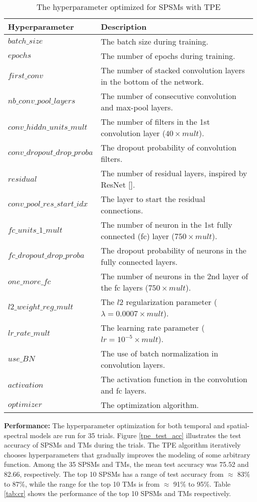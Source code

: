 \documentclass{article}
\begin{document}
\begin{table*}[h!tb]
    \centering
    \caption{The hyperparameter optimized for SPSMs with TPE}
    \begin{tabular}{ll}
      \textbf{Hyperparameter} & \textbf{Description} \\
      \hline
      $batch\_size$ & The batch size during training. \\
      $epochs$ & The number of epochs during training.  \\
      $first\_conv$ & The number of stacked convolution layers in the bottom of the network. \\
      $nb\_conv\_pool\_layers$ & The number of consecutive convolution and max-pool layers. \\
      $conv\_hiddn\_units\_mult$ & The number of filters in the 1st convolution layer ($40 \times mult$). \\
      $conv\_dropout\_drop\_proba$ &  The dropout probability of convolution filters. \\
      $residual$ & The number of residual layers, inspired by ResNet [\cite{resnet}]. \\
      $conv\_pool\_res\_start\_idx$ & The layer to start the residual connections. \\
      $fc\_units\_1\_mult$ & The number of neuron in the 1st fully connected (fc) layer ($750 \times mult$). \\
      $fc\_dropout\_drop\_proba$ & The dropout probability of neurons in the fully connected layers. \\
      $one\_more\_fc$ & The number of neurons in the 2nd layer of the fc layers ($750 \times mult$). \\
      $l2\_weight\_reg\_mult$ & The $l2$ regularization parameter ($\lambda = 0.0007 \times mult$). \\
      $lr\_rate\_mult$ & The learning rate parameter ($lr = 10 ^ {-5} \times mult$). \\
      $use\_BN$ & The use of batch normalization in convolution layers. \\
      $activation$ & The activation function in the convolution and fc layers. \\
      $optimizer$ & The optimization algorithm.
    \end{tabular}

    \label{tab:tpe_var_spsm}
\end{table*}

\textbf{Performance:} The hyperparameter optimization for both temporal and spatial-spectral models are run for 35 trials. Figure \ref{tpe_test_acc} illustrates the test accuracy of SPSMs and TMs during the trials. The TPE algorithm iteratively chooses hyperparameters that gradually improves the modeling of some arbitrary function. Among the 35 SPSMs and TMs, the mean test accuracy was 75.52 and 82.66, respectively. The top 10 SPSMs has a range of test accuracy from $\approx$ 83\% to 87\%, while the range for the top 10 TMs is from $\approx$ 91\% to 95\%. Table \ref{tab:cr} shows the performance of the top 10 SPSMs and TMs respectively.
\end{document}

